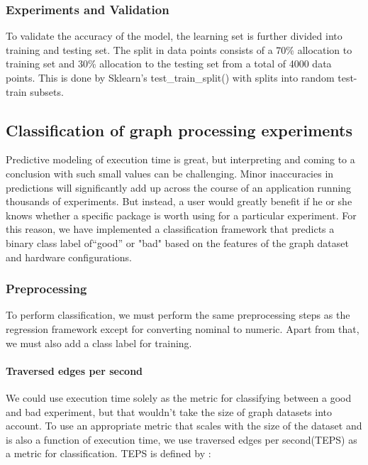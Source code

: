 \subsubsection{Experiments and Validation}
To validate the accuracy of the model, the learning set is further divided into training and testing set. The split in data points consists of a 70\% allocation to training set and 30\% allocation to the testing set from a total of 4000 data points. This is done by Sklearn's test\_train\_split() with splits into random test-train subsets. 


\subsection{Classification of graph processing experiments}

Predictive modeling of execution time is great, but interpreting and coming to a conclusion with such small values can be challenging. Minor inaccuracies in predictions will significantly add up across the course of an application running thousands of experiments. But instead, a user would greatly benefit if he or she knows whether a specific package is worth using for a particular experiment. For this reason, we have implemented a classification framework that predicts a binary class label of``good'' or "bad" based on the features of the graph dataset and hardware configurations.  

\subsubsection{Preprocessing}
To perform classification, we must perform the same preprocessing steps as the regression framework except for converting nominal to numeric. Apart from that, we must also add a class label for training. 

\paragraph{Traversed edges per second}
We could use execution time solely as the metric for classifying between a good and bad experiment, but that wouldn't take the size of graph datasets into account. To use an appropriate metric that scales with the size of the dataset and is also a function of execution time, we use traversed edges per second(TEPS) as a metric for classification. TEPS is defined by :


